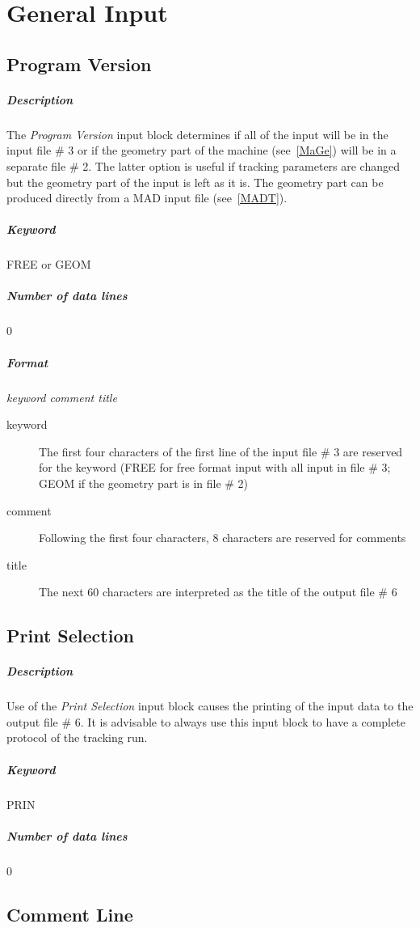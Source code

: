 \documentclass[a4paper,11pt]{report}
\begin{document}
\section{General Input}

\subsection{Program Version} \label{ProVer}

\subparagraph{Description} The {\em Program Version} \/input block
determines if all of the input will be in the input file \# 3 or if
the geometry part of the machine (see~\ref{MaGe}) will be in a
separate file \# 2.  The latter option is useful if tracking
parameters are changed but the geometry part of the input is left as
it is.  The geometry part can be produced directly from a MAD input
file (see~\ref{MADT}). 

\subparagraph{Keyword} FREE or GEOM \subparagraph{Number of data
  lines} 0

\subparagraph{Format} {\em keyword comment title}

\begin{description}
\item [keyword] The first four characters of the first line of the
  input file \# 3 are reserved for the keyword (FREE for free format
  input with all input in file \# 3; GEOM if the geometry part is in
  file \# 2)
\item [comment] Following the first four characters, 8 characters are
  reserved for comments
\item [title] The next 60 characters are interpreted as the title of
  the output file \# 6
\end{description}

\subsection{Print Selection} \label{PriSel}

\subparagraph{Description} Use of the {\em Print Selection} \/input
block causes the printing of the input data to the output file \# 6.
It is advisable to always use this input block to have a complete
protocol of the tracking run.

\subparagraph{Keyword} PRIN \subparagraph{Number of data lines} 0

\subsection{Comment Line} \label{ComLin}
\end{document}

